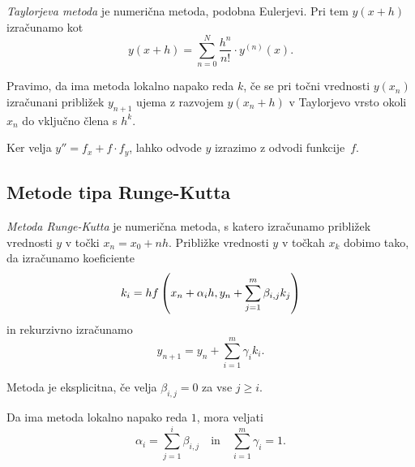 \begin{definicija}
\emph{Taylorjeva metoda} je numerična
metoda, podobna Eulerjevi. Pri tem $y(x+h)$ izračunamo kot
\[
y(x+h) = \sum_{n=0}^N \frac{h^n}{n!} \cdot y^{(n)}(x).
\]
\end{definicija}

\begin{definicija}
Pravimo, da ima metoda lokalno napako reda $k$, če se pri točni
vrednosti $y(x_n)$ izračunani približek $y_{n+1}$ ujema z razvojem
$y(x_n+h)$ v Taylorjevo vrsto okoli $x_n$ do vključno člena s
$h^k$.
\end{definicija}

\begin{opomba}
Ker velja $y'' = f_x + f \cdot f_y$, lahko odvode $y$ izrazimo z
odvodi funkcije~$f$.
\end{opomba}

\newpage

\subsection{Metode tipa Runge-Kutta}

\begin{definicija}
\emph{Metoda Runge-Kutta} je
numerična metoda, s katero izračunamo približek vrednosti $y$ v
točki $x_n = x_0 + nh$. Približke vrednosti $y$ v točkah $x_k$
dobimo tako, da izračunamo koeficiente
\[
k_i = h f \left(x_n + \alpha_i h, y_n + \sum_{j=1}^m \beta_{i,j} k_j\right)
\]
in rekurzivno izračunamo
\[
y_{n+1} = y_n + \sum_{i=1}^m \gamma_i k_i.
\]
\end{definicija}

\begin{opomba}
Metoda je eksplicitna, če velja $\beta_{i,j} = 0$ za vse
$j \geq i$.
\end{opomba}

\begin{opomba}
Da ima metoda lokalno napako reda $1$, mora veljati
\[
\alpha_i = \sum_{j=1}^i \beta_{i,j}
\quad \text{in} \quad
\sum_{i=1}^m \gamma_i = 1.
\]
\end{opomba}


